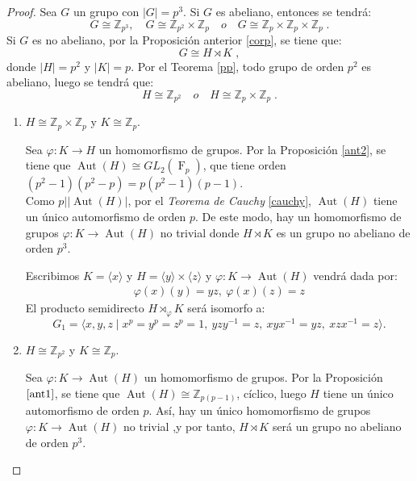 \begin{proof}
Sea $G$ un grupo con $|G|=p^3$. Si $G$ es abeliano, entonces se tendrá:
\[
G \cong \mathbb{Z}_{p^3}, \quad G \cong \mathbb{Z}_{p^2} \times \mathbb{Z}_p\quad o \quad G \cong \mathbb{Z}_p \times \mathbb{Z}_p \times \mathbb{Z}_p \; .
\]
Si $G$ es no abeliano, por la Proposición anterior \ref{corp}, se tiene que:
\[
    G \cong H \rtimes K \;,
\]
donde $|H|=p^2$ y $|K|=p$. Por el Teorema \ref{pp}, todo grupo de orden $p^2$ es abeliano, luego se tendrá que:
\[
H \cong \mathbb{Z}_{p^2} \quad o \quad H \cong \mathbb{Z}_p \times \mathbb{Z}_p \; .
\]

\begin{enumerate}
    \item $H \cong \mathbb{Z}_p \times \mathbb{Z}_p$ y $K \cong \mathbb{Z}_p$. 
    
    Sea $\varphi \colon K \rightarrow H$ un homomorfismo de grupos. Por la Proposición \ref{ant2}, se tiene que $\operatorname{Aut}(H) \cong GL_2(\operatorname{F}_p)$, que tiene orden $(p^2-1)(p^2-p) = p(p^2-1)(p-1)$.\\   %
    Como $p \big | |\operatorname{Aut}(H)|$, por el \textit{Teorema de Cauchy} \ref{cauchy}, $\operatorname{Aut}(H)$ tiene un único automorfismo de orden $p$. De este modo, hay un homomorfismo de grupos $\varphi \colon K \rightarrow \operatorname{Aut}(H)$ no trivial donde  $H\rtimes K$ es un grupo no abeliano de orden $p^3$.
    
    Escribimos $K = \langle x \rangle $ y $H=\langle y \rangle \times \langle z \rangle$  y $\varphi \colon K \to \operatorname{Aut}(H)$ vendrá dada por:
    \begin{align*}
    \varphi(x)(y)=yz , \: \varphi(x)(z)=z 
    \end{align*}
    El producto semidirecto $H \rtimes_{\varphi} K$ será isomorfo a:
    \[
    G_1 = \langle x,y,z \mid x^p = y^p = z^p = 1, \:yzy^{-1}=z,\: xyx^{-1}=yz, \: xzx^{-1}=z \rangle .
    \]
    
    \item $H \cong \mathbb{Z}_{p^2}$ y $K\cong \mathbb{Z}_p$.
    
    Sea $\varphi \colon K \rightarrow \operatorname{Aut}(H)$ un homomorfismo de grupos. Por la Proposición $\ref{ant1}$, se tiene que $\operatorname{Aut}(H) \cong \mathbb{Z}_{p(p-1)}$, cíclico, luego $H$ tiene un único automorfismo de orden $p$. Así, hay un único homomorfismo de grupos $\varphi \colon K \rightarrow \operatorname{Aut}(H)$ no trivial ,y por tanto, $H \rtimes K$ será un grupo no abeliano de orden $p^3$.
    

\end{enumerate}
\end{proof}
